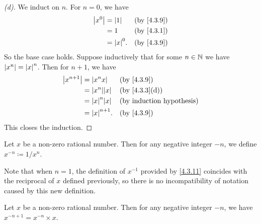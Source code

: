 \begin{proof}[(d)]
  We induct on \(n\).
  For \(n = 0\), we have
  \begin{align*}
    \abs{x^0} & = \abs{1}    &  & \by{4.3.9} \\
              & = 1          &  & \by{4.3.1} \\
              & = \abs{x}^0. &  & \by{4.3.9}
  \end{align*}
  So the base case holds.
  Suppose inductively that for some \(n \in \mathbb{N}\) we have \(\left\lvert x^n\right\rvert = \left\lvert x\right\rvert^n\).
  Then for \(n + 1\), we have
  \begin{align*}
    \abs{x^{n + 1}} & = \abs{x^n x}       &  & \by{4.3.9}    \\
                    & = \abs{x^n} \abs{x} &  & \by{4.3.3}[d] \\
                    & = \abs{x}^n \abs{x} &  & \byIH         \\
                    & = \abs{x}^{n + 1}.  &  & \by{4.3.9}
  \end{align*}
  This closes the induction.
\end{proof}

\begin{defn}\label{4.3.11}
  Let \(x\) be a non-zero rational number.
  Then for any negative integer \(-n\), we define \(x^{-n} \coloneqq 1 / x^n\).

  Note that when \(n = 1\), the definition of \(x^{-1}\) provided by \cref{4.3.11} coincides with the reciprocal of \(x\) defined previously, so there is no incompatibility of notation caused by this new definition.
\end{defn}


\begin{ac}\label{ac:4.3.2}
  Let \(x\) be a non-zero rational number.
  Then for any negative integer \(-n\), we have \(x^{-n + 1} = x^{-n} \times x\).
\end{ac}

